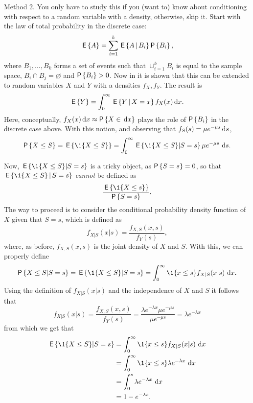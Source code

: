 \begin{exercise}
\begin{solution}
Method 2. You only have to study this if you (want to) know about conditioning with respect to a random variable with a density, otherwise, skip it.  Start with  the law of total probability in the discrete case: 
\begin{equation*}
  \E{A} = \sum_{i=1}^k \E{A\given B_i} \P{B_i},
\end{equation*}
where $B_1,\ldots, B_k$ forms a set of events such that $\cup_{i=1}^k B_i$ is equal to the sample space, $B_i\cap B_j = \varnothing$ and $\P{B_i}>0$. Now in \cite{capinski03:_probab_probl} it is shown that this can be extended to random variables $X$ and $Y$ with a densities $f_X, f_Y$. The result is
\begin{equation*}
  \,\mathsf{E}\left\{Y\right\} = \int_0^\infty \,\mathsf{E}\left\{Y\,\middle|\, X=x\right\} f_X(x)\,\text{d}x.
\end{equation*}
Here, conceptually, $f_X(x)\d x \approx \P{X\in \d x}$ plays the role of $\P{B_i}$ in the discrete case above. With this notion, and observing that $f_S(s) = \mu e^{-\mu s} \,\text{d}s$,
\begin{equation*}
\P{X\leq S} = \E{\1{X\leq S}} = \int_0^\infty \E{\1{X\leq S}| S=s} \mu e^{-\mu s} \,  \d s.
\end{equation*}

Now, $\E{\1{X\leq S}| S=s}$ is a tricky object, as $\P{S=s} = 0$, so that 
$\E{\1{X\leq S}\given S=s}$ \emph{cannot} be defined as 
\begin{equation*}
\frac{\E{\1{X\leq s}}}{\P{S=s}}.
\end{equation*}
The way to proceed is to consider the conditional probability density function of $X$ given that $S=s$, which is defined as
\begin{equation*}
  f_{X|S}(x|s) = \frac{f_{X, S}( x, s)}{f_Y(s)},
\end{equation*}
where, as before, $f_{X, S}( x, s)$ is the joint density of $X$ and $S$. With this, we can properly define
\begin{equation*}
  \begin{split}
  \P{X\leq S| S=s } = \E{\1{X \leq S}| S=s } = \int_0^\infty \1{x \leq s}   f_{X|S}(x|s)\, \d x.
  \end{split}
\end{equation*}
Using the definition of $f_{X|S}(x|s)$ and the independence of $X$ and $S$ it follows that
\begin{equation*}
  f_{X|S}(x|s) = \frac{f_{X, S}( x, s)}{f_Y(s)} = \frac{\lambda e^{-\lambda x} \mu e^{-\mu s}}{\mu e^{-\mu s}} = \lambda e^{-\lambda x}
\end{equation*}
from which we get that 
\begin{equation*}
  \begin{split}
  \E{\1{X \leq S}| S=s } 
&= \int_0^\infty \1{x \leq s}   f_{X|S}(x|s)\, \d x \\
&= \int_0^\infty \1{x \leq s} \lambda e^{-\lambda x}\, \d x \\
&= \int_0^s \lambda e^{-\lambda x}\, \d x \\
&= 1 - e^{-\lambda s}.
  \end{split}
\end{equation*}


\end{solution}
\end{exercise}
